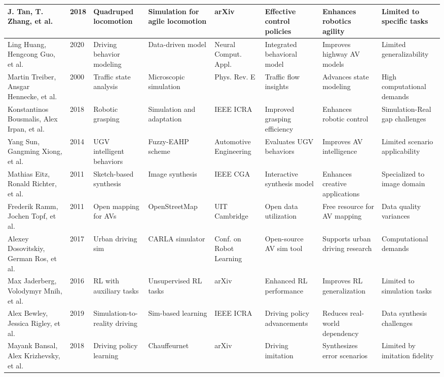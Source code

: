 \documentclass[lettersize,journal]{IEEEtran}
\begin{document}
\begin{longtable}{|p{2cm}|p{1cm}|p{2cm}|p{2cm}|p{2cm}|p{2cm}|p{2cm}|p{2.5cm}|}
\hline
J. Tan, T. Zhang, et al. & 2018 & Quadruped locomotion & Simulation for agile locomotion & arXiv & Effective control policies & Enhances robotics agility & Limited to specific tasks \\
\hline
Ling Huang, Hengcong Guo, et al. & 2020 & Driving behavior modeling & Data-driven model & Neural Comput. Appl. & Integrated behavioral model & Improves highway AV models & Limited generalizability \\
\hline
Martin Treiber, Ansgar Hennecke, et al. & 2000 & Traffic state analysis & Microscopic simulation & Phys. Rev. E & Traffic flow insights & Advances state modeling & High computational demands \\
\hline
Konstantinos Bousmalis, Alex Irpan, et al. & 2018 & Robotic grasping & Simulation and adaptation & IEEE ICRA & Improved grasping efficiency & Enhances robotic control & Simulation-Real gap challenges \\
\hline
Yang Sun, Gangming Xiong, et al. & 2014 & UGV intelligent behaviors & Fuzzy-EAHP scheme & Automotive Engineering & Evaluates UGV behaviors & Improves AV intelligence & Limited scenario applicability \\
\hline
Mathias Eitz, Ronald Richter, et al. & 2011 & Sketch-based synthesis & Image synthesis & IEEE CGA & Interactive synthesis model & Enhances creative applications & Specialized to image domain \\
\hline
Frederik Ramm, Jochen Topf, et al. & 2011 & Open mapping for AVs & OpenStreetMap & UIT Cambridge & Open data utilization & Free resource for AV mapping & Data quality variances \\
\hline
Alexey Dosovitskiy, German Ros, et al. & 2017 & Urban driving sim & CARLA simulator & Conf. on Robot Learning & Open-source AV sim tool & Supports urban driving research & Computational demands \\
\hline
Max Jaderberg, Volodymyr Mnih, et al. & 2016 & RL with auxiliary tasks & Unsupervised RL tasks & arXiv & Enhanced RL performance & Improves RL generalization & Limited to simulation tasks \\
\hline
Alex Bewley, Jessica Rigley, et al. & 2019 & Simulation-to-reality driving & Sim-based learning & IEEE ICRA & Driving policy advancements & Reduces real-world dependency & Data synthesis challenges \\
\hline
Mayank Bansal, Alex Krizhevsky, et al. & 2018 & Driving policy learning & Chauffeurnet & arXiv & Driving imitation & Synthesizes error scenarios & Limited by imitation fidelity \\

\end{longtable}
\end{document}
